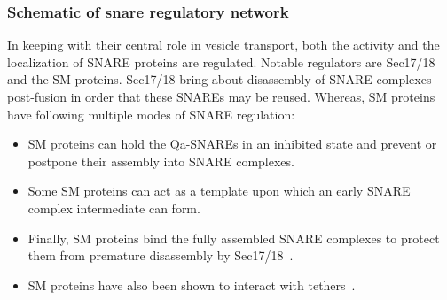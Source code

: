 \subsubsection{Schematic of snare regulatory network}
In keeping with their central role in vesicle transport, both the activity and the localization of SNARE proteins are regulated. Notable regulators are Sec17/18 and the SM proteins.
%
Sec17/18 bring about disassembly of SNARE complexes post-fusion in order that these SNAREs may be reused. 
%
Whereas, SM proteins have following multiple modes of SNARE regulation: 
\begin{itemize}
	\item SM proteins can hold
	the Qa-SNAREs in an inhibited state and prevent or postpone their assembly into SNARE
	complexes.
	\item Some SM proteins can act as a template upon which an early SNARE complex intermediate can
	form.
	\item Finally, SM proteins bind the fully assembled
	SNARE complexes to protect them from premature disassembly by Sec17/18~\cite{baker2016chaperoning}.
	\item SM proteins have also been shown to interact with tethers~\cite{yoon2018snare}.
\end{itemize}

